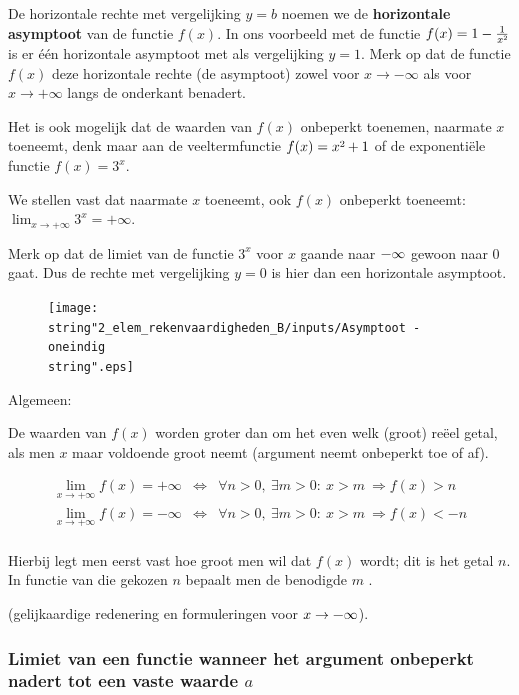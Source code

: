 De horizontale rechte met vergelijking $y=b$ noemen we de \textbf{horizontale
asymptoot} van de functie $f(x)$. In ons voorbeeld met de functie
$f(x)= 1-\frac{1}{x\text{\texttwosuperior}}$ is er
\'e\'en horizontale asymptoot met als vergelijking $y=1$. Merk op dat
de functie $f(x)$ deze horizontale rechte (de asymptoot) zowel voor
$x\rightarrow-\infty$ als voor $x\rightarrow+\infty$ langs de onderkant
benadert.

Het is ook mogelijk dat de waarden van $f(x)$ onbeperkt
toenemen, naarmate $x$ toeneemt, denk maar aan de veeltermfunctie
$f(x)=x\text{\texttwosuperior}+1$ of de exponenti\"ele functie $f(x)=3^{x}$.

We stellen vast dat naarmate $x$ toeneemt, ook $f(x)$
onbeperkt toeneemt: $ \lim_{x\to+\infty}3^{x}=+\infty$. 

Merk op dat de limiet van de functie $3^{x}$ voor $x$
gaande naar $\text{\textminus\ensuremath{\infty}}$ gewoon naar $0$
gaat. Dus de rechte met vergelijking $y=0$ is hier dan een horizontale
asymptoot.

\begin{figure}[h]
\centering{}\texttt{[image: \\string"2\_elem\_rekenvaardigheden\_B/inputs/Asymptoot - oneindig\\string".eps]} 
\end{figure}

Algemeen:

De waarden van $f(x)$ worden groter dan om het even welk (groot)
re\"eel getal, als men $x$ maar voldoende groot neemt (argument neemt
onbeperkt toe of af).

\begin{eqnarray*}
 \lim_{x\to+\infty}f(x)=+\infty & \Leftrightarrow & \forall n>0,\:\exists m>0:\:x>m\:\Rightarrow f(x)>n\\
 \lim_{x\to+\infty}f(x)=-\infty & \Leftrightarrow & \forall n>0,\:\exists m>0:\:x>m\:\Rightarrow f(x)<-n\\
\end{eqnarray*} 

Hierbij legt men eerst vast hoe groot men wil dat $f(x)$ wordt; dit
is het getal $n$. In functie van die gekozen $n$ bepaalt men de
benodigde $m$ .

(gelijkaardige redenering en formuleringen voor $x\rightarrow\text{\textminus\ensuremath{\infty}}$).


\subsubsection{Limiet van een functie wanneer het argument onbeperkt nadert tot
een vaste waarde $a$}


